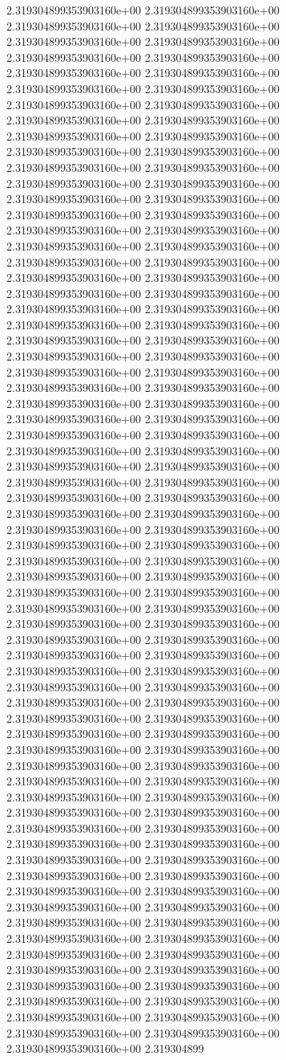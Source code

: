 2.319304899353903160e+00	2.319304899353903160e+00	2.319304899353903160e+00	2.319304899353903160e+00	2.319304899353903160e+00	2.319304899353903160e+00	2.319304899353903160e+00	2.319304899353903160e+00	2.319304899353903160e+00	2.319304899353903160e+00	2.319304899353903160e+00	2.319304899353903160e+00	2.319304899353903160e+00	2.319304899353903160e+00	2.319304899353903160e+00	2.319304899353903160e+00	2.319304899353903160e+00	2.319304899353903160e+00	2.319304899353903160e+00	2.319304899353903160e+00	2.319304899353903160e+00	2.319304899353903160e+00	2.319304899353903160e+00	2.319304899353903160e+00	2.319304899353903160e+00	2.319304899353903160e+00	2.319304899353903160e+00	2.319304899353903160e+00	2.319304899353903160e+00	2.319304899353903160e+00	2.319304899353903160e+00	2.319304899353903160e+00	2.319304899353903160e+00	2.319304899353903160e+00	2.319304899353903160e+00	2.319304899353903160e+00	2.319304899353903160e+00	2.319304899353903160e+00	2.319304899353903160e+00	2.319304899353903160e+00	2.319304899353903160e+00	2.319304899353903160e+00	2.319304899353903160e+00	2.319304899353903160e+00	2.319304899353903160e+00	2.319304899353903160e+00	2.319304899353903160e+00	2.319304899353903160e+00	2.319304899353903160e+00	2.319304899353903160e+00	2.319304899353903160e+00	2.319304899353903160e+00	2.319304899353903160e+00	2.319304899353903160e+00	2.319304899353903160e+00	2.319304899353903160e+00	2.319304899353903160e+00	2.319304899353903160e+00	2.319304899353903160e+00	2.319304899353903160e+00	2.319304899353903160e+00	2.319304899353903160e+00	2.319304899353903160e+00	2.319304899353903160e+00	2.319304899353903160e+00	2.319304899353903160e+00	2.319304899353903160e+00	2.319304899353903160e+00	2.319304899353903160e+00	2.319304899353903160e+00	2.319304899353903160e+00	2.319304899353903160e+00	2.319304899353903160e+00	2.319304899353903160e+00	2.319304899353903160e+00	2.319304899353903160e+00	2.319304899353903160e+00	2.319304899353903160e+00	2.319304899353903160e+00	2.319304899353903160e+00	2.319304899353903160e+00	2.319304899353903160e+00	2.319304899353903160e+00	2.319304899353903160e+00	2.319304899353903160e+00	2.319304899353903160e+00	2.319304899353903160e+00	2.319304899353903160e+00	2.319304899353903160e+00	2.319304899353903160e+00	2.319304899353903160e+00	2.319304899353903160e+00	2.319304899353903160e+00	2.319304899353903160e+00	2.319304899353903160e+00	2.319304899353903160e+00	2.319304899353903160e+00	2.319304899353903160e+00	2.319304899353903160e+00	2.319304899353903160e+00	2.319304899353903160e+00	2.319304899353903160e+00	2.319304899353903160e+00	2.319304899353903160e+00	2.319304899353903160e+00	2.319304899353903160e+00	2.319304899353903160e+00	2.319304899353903160e+00	2.319304899353903160e+00	2.319304899353903160e+00	2.319304899353903160e+00	2.319304899353903160e+00	2.319304899353903160e+00	2.319304899353903160e+00	2.319304899353903160e+00	2.319304899353903160e+00	2.319304899353903160e+00	2.319304899353903160e+00	2.319304899353903160e+00	2.319304899353903160e+00	2.319304899353903160e+00	2.319304899353903160e+00	2.319304899353903160e+00	2.319304899353903160e+00	2.319304899353903160e+00	2.319304899353903160e+00	2.319304899353903160e+00	2.319304899353903160e+00	2.319304899353903160e+00	2.319304899353903160e+00	2.319304899353903160e+00	2.319304899353903160e+00	2.319304899353903160e+00	2.319304899